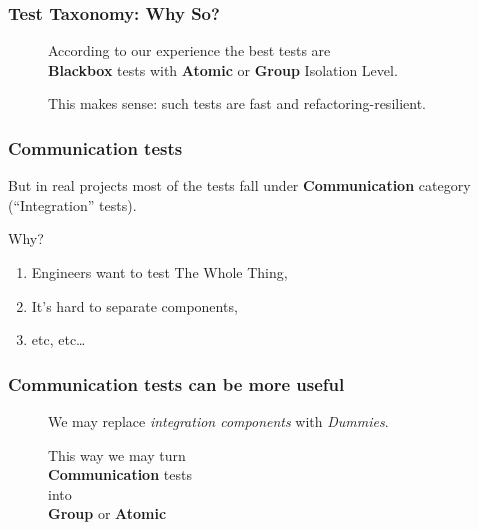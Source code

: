 \documentclass[usenames,dvipsnames,aspectratio=169]{beamer}
\begin{document}
\begin{frame}
  \frametitle{Test Taxonomy: Why So?}
  \begin{figure}
    According to our experience the best tests are \\
     \textbf{Blackbox} tests with \textbf{Atomic} or \textbf{Group} Isolation Level.
  \end{figure}
  \begin{figure}
    This makes sense: such tests are fast and refactoring-resilient.
  \end{figure}
\end{frame}

\begin{frame}
  \frametitle{Communication tests}
  But in real projects most of the tests fall under \textbf{Communication} category  (``Integration'' tests).

  \vspace{0.3cm}
  Why?
  \begin{enumerate}
  \item Engineers want to test The Whole Thing,
  \item It's hard to separate components,
  \item etc, etc\dots
  \end{enumerate}
\end{frame}

\begin{frame}
  \frametitle{Communication tests can be more useful}

  \begin{figure}
  We may replace \textit{integration components} with \textit{Dummies}\footnotemark[1].
  \end{figure}

  \begin{figure}
  This way we may turn \\
  \textbf{Communication} tests \\
  into \\
  \textbf{Group} or \textbf{Atomic}\footnotemark[2]
  \end{figure}

\end{frame}
\end{document}
